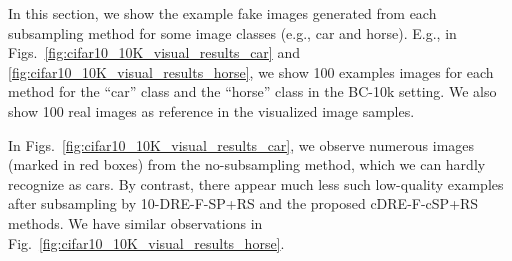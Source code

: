\documentclass[10pt, twocolumn]{article}
\theoremstyle{definition}
\begin{document}
In this section, we show the example fake images generated from each subsampling method for some image classes (e.g., car and horse). E.g., in Figs.\ \ref{fig:cifar10_10K_visual_results_car} and \ref{fig:cifar10_10K_visual_results_horse}, we show 100 examples images for each method for the ``car'' class and the ``horse'' class in the BC-10k setting. We also show 100 real images as reference in the visualized image samples. 

In Figs.\ \ref{fig:cifar10_10K_visual_results_car}, we observe numerous images (marked in red boxes) from the no-subsampling method, which we can hardly recognize as cars. By contrast, there appear much less such low-quality examples after subsampling by 10-DRE-F-SP+RS and the proposed cDRE-F-cSP+RS methods. We have similar observations in Fig.~\ref{fig:cifar10_10K_visual_results_horse}.   

\begin{figure*}[!htbp]
	\centering
	\quad
	\\
	\quad
	\caption{Example CIFAR-10 images for the ``car'' class in the BC-10k setting.}
	\label{fig:cifar10_10K_visual_results_car}
\end{figure*}

\begin{figure*}[!htbp]
	\centering
	\quad
	\\
	\quad
	\caption{Example CIFAR-10 images for the ``horse'' class in the BC-10k setting.}
	\label{fig:cifar10_10K_visual_results_horse}
\end{figure*}
\end{document}
